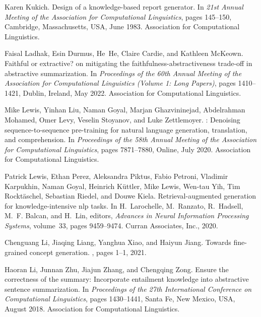 \documentclass[11pt]{article}
\begin{document}
\begin{thebibliography}{100}
Karen Kukich.
\newblock Design of a knowledge-based report generator.
\newblock In {\em 21st Annual Meeting of the Association for Computational
  Linguistics}, pages 145--150, Cambridge, Massachusetts, USA, June 1983.
  Association for Computational Linguistics.

Faisal Ladhak, Esin Durmus, He~He, Claire Cardie, and Kathleen McKeown.
\newblock Faithful or extractive? on mitigating the
  faithfulness-abstractiveness trade-off in abstractive summarization.
\newblock In {\em Proceedings of the 60th Annual Meeting of the Association for
  Computational Linguistics (Volume 1: Long Papers)}, pages 1410--1421, Dublin,
  Ireland, May 2022. Association for Computational Linguistics.

Mike Lewis, Yinhan Liu, Naman Goyal, Marjan Ghazvininejad, Abdelrahman Mohamed,
  Omer Levy, Veselin Stoyanov, and Luke Zettlemoyer.
: Denoising sequence-to-sequence pre-training for natural
  language generation, translation, and comprehension.
\newblock In {\em Proceedings of the 58th Annual Meeting of the Association for
  Computational Linguistics}, pages 7871--7880, Online, July 2020. Association
  for Computational Linguistics.

Patrick Lewis, Ethan Perez, Aleksandra Piktus, Fabio Petroni, Vladimir
  Karpukhin, Naman Goyal, Heinrich K\"{u}ttler, Mike Lewis, Wen-tau Yih, Tim
  Rockt\"{a}schel, Sebastian Riedel, and Douwe Kiela.
\newblock Retrieval-augmented generation for knowledge-intensive nlp tasks.
\newblock In H.~Larochelle, M.~Ranzato, R.~Hadsell, M.~F. Balcan, and H.~Lin,
  editors, {\em Advances in Neural Information Processing Systems}, volume~33,
  pages 9459--9474. Curran Associates, Inc., 2020.

Chenguang Li, Jiaqing Liang, Yanghua Xiao, and Haiyun Jiang.
\newblock Towards fine-grained concept generation.
, pages
  1--1, 2021.

Haoran Li, Junnan Zhu, Jiajun Zhang, and Chengqing Zong.
\newblock Ensure the correctness of the summary: Incorporate entailment
  knowledge into abstractive sentence summarization.
\newblock In {\em Proceedings of the 27th International Conference on
  Computational Linguistics}, pages 1430--1441, Santa Fe, New Mexico, USA,
  August 2018. Association for Computational Linguistics.


\end{thebibliography}
\end{document}
